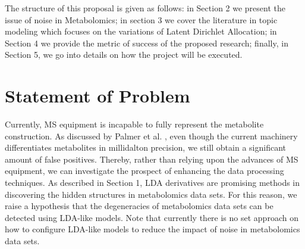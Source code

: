\documentclass{mprop}
\begin{document}
\par The structure of this proposal is given as follows: in Section 2 we present the issue of noise in Metabolomics; in section 3 we cover the literature in topic modeling which focuses on the variations of Latent Dirichlet Allocation; in Section 4 we provide the metric of success of the proposed research; finally, in Section 5, we go into details on how the project will be executed.

\section{Statement of Problem}

\par Currently, MS equipment is incapable to fully represent the metabolite construction. As discussed by Palmer et al. \cite{palmer}, even though the current machinery differentiates metabolites in millidalton precision, we still obtain a significant amount of false positives. Thereby, rather than relying upon the advances of MS equipment, we can investigate the prospect of enhancing the data processing techniques. As described in Section 1, LDA derivatives are promising methods in discovering the hidden structures in metabolomics data sets. For this reason, we raise a hypothesis that the degeneracies of metabolomics data sets can be detected using LDA-like models. Note that currently there is no set approach on how to configure LDA-like models to reduce the impact of noise in metabolomics data sets.  
\end{document}
